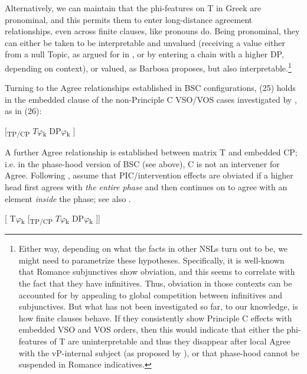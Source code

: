 \documentclass[output=paper]{langsci/langscibook}
\begin{document}
Alternatively, we can maintain that the phi-features on T in Greek are pronominal, and this permits them to enter long-distance agreement relationships, even across finite clauses, like pronouns do. Being pronominal, they can either be taken to be interpretable and unvalued (receiving a value either from a null Topic, as argued for in \citet{Frascarelli2007}, or by entering a chain with a higher DP, depending on context), or valued, as Barbosa proposes, but also interpretable.\footnote{Either way, depending on what the facts in other NSLs turn out to be, we might need to parametrize these hypotheses. Specifically, it is well-known that Romance subjunctives show obviation, and this seems to correlate with the fact that they have infinitives. Thus, obviation in those contexts can be accounted for by appealing to global competition between infinitives and subjunctives. But what has not been investigated so far, to our knowledge, is how finite clauses behave. If they consistently show Principle C effects with embedded VSO and VOS orders, then this would indicate that either the phi-features of T are uninterpretable and thus they disappear after local Agree with the vP-internal subject (as proposed by \citealt{Barbosa2009}), or that phase-hood cannot be suspended in Romance indicatives.} 

Turning to the Agree relationships established in BSC configurations, (25) holds in the embedded clause of the non-Principle C VSO\slash VOS cases investigated by \citet{Tsakali2017}, as in (26):

\ea%
    \label{ex:alexiadou:31}
     \textsubscript{} [\textsubscript{TP/CP}    $T\varphi $\textsubscript{k}    DP$\varphi $\textsubscript{k}  ] 
\z
       

A further Agree relationship is established between matrix T and embedded CP; i.e. in the phase-hood version of BSC (see above), C is not an intervener for Agree. Following \citet{Rackowski2005}, \citet{Tsakali2017} assume that PIC\slash intervention effects are obviated if a higher head first agrees with \textit{the entire phase} and then continues on to agree with an element \textit{inside} the phase; see also \citet{Halpert2016}. 

\ea%
    \label{ex:alexiadou:32}
    [   T$\varphi $\textsubscript{k} [\textsubscript{TP/CP}    $T\varphi $\textsubscript{k}    DP$\varphi $\textsubscript{k}  ]]      
\z
    
\end{document}
